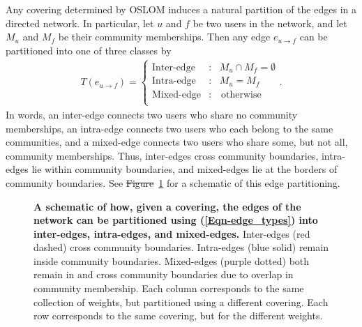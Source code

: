 \documentclass[10pt,letterpaper]{article}
\providecommand{\DIFadd}[1]{{\protect\color{blue}\uwave{#1}}} %
\providecommand{\DIFdel}[1]{{\protect\color{red}\sout{#1}}}                      %
\providecommand{\DIFaddbegin}{} %
\providecommand{\DIFaddend}{} %
\providecommand{\DIFdelbegin}{} %
\providecommand{\DIFdelend}{} %
\begin{document}
Any covering determined by OSLOM induces a natural partition of the edges in a directed network. In particular, let $u$ and $f$ be two users in the network, and let $M_{u}$ and $M_{f}$ be their community memberships. Then any edge $e_{u \to f}$ can be partitioned into one of three classes by
\begin{align}
	T(e_{u \to f}) = \left\{ \begin{array}{ll}
		\text{Inter-edge} &: \ \ \ M_{u} \cap M_{f} = \emptyset \\
		\text{Intra-edge} &: \ \ \ M_{u} = M_{f}\\
		\text{Mixed-edge} &: \ \ \ \text{ otherwise} \\
	\end{array}\right. \label{Eqn-edge_types}.
\end{align}
In words, an inter-edge connects two users who share no community memberships, an intra-edge connects two users who each belong to the same communities, and a mixed-edge connects two users who share some, but not all, community memberships. Thus, inter-edges cross community boundaries, intra-edges lie within community boundaries, and mixed-edges lie at the borders of community boundaries. See \DIFdelbegin \DIFdel{Figure}\DIFdelend \DIFaddbegin \DIFadd{Fig.}\DIFaddend ~\ref{Fig-edge_types} for a schematic of this edge partitioning.

\begin{figure}[!h]
	\centering
	\caption{\textbf{A schematic of how, given a covering, the edges of the network can be partitioned using (\ref{Eqn-edge_types}) into inter-edges, intra-edges, and mixed-edges.} Inter-edges (red dashed) cross community boundaries. Intra-edges (blue solid) remain inside community boundaries. Mixed-edges (purple dotted) both remain in and cross community boundaries due to overlap in community membership. Each column corresponds to the same collection of weights, but partitioned using a different covering. Each row corresponds to the same covering, but for the different weights.}
	\label{Fig-edge_types}
\end{figure}

\end{document}
